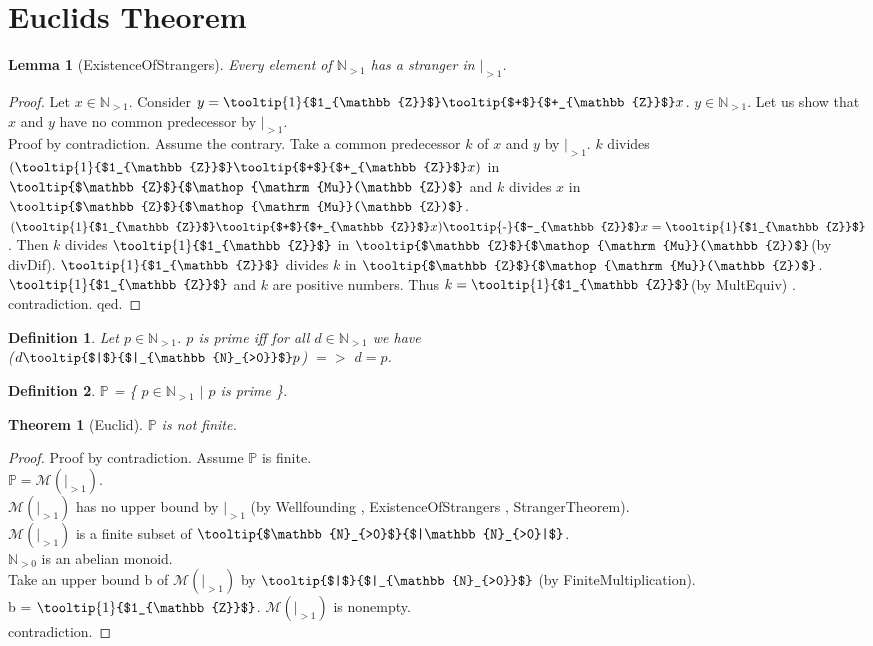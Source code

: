 \documentclass{article}
\DeclareMathOperator{\MuC}{Mu}
\newcommand{\sG}[1]{\mbox{\tooltip{$#1$}{$|#1|$}}}
\newcommand{\pR}[1]{\mbox{\tooltip{$+$}{$+_{#1}$}}}
\newcommand{\Mu}[1]{\mbox{\tooltip{$#1$}{$\MuC(#1)$}}}
\newcommand{\mR}[1]{\mbox{\tooltip{-}{$-_{#1}$}}}
\newcommand{\oR}[1]{\mbox{\tooltip{1}{$1_{#1}$}}}
\newcommand{\oC}[1]{#1}
\newcommand{\Min}[1]{\mathcal{M}(#1)}
\newcommand{\Z}{\mathbb{Z}}
\newcommand{\cP}{\mathbb{P}}
\newcommand{\NPOS}{\mathbb{N}_{>1}}
\newcommand{\NDIV}{\vert_{>1}}
\newcommand{\DIVI}[1]{\mbox{\tooltip{$|$}{$|_{#1}$}}}
\newcommand{\MoPos}{\mathbb{N}_{>0}}
\newtheorem*{definition}{Definition}
\newtheorem{lemma}{Lemma}
\newtheorem*{theorem}{Theorem}
\begin{document}
\section{Euclids Theorem}
\begin{forthel}
	\begin{lemma}[ExistenceOfStrangers]
		Every element of $\NPOS$ has a stranger in $\NDIV$.
	\end{lemma}
	
	\begin{proof}
		Let $x \in \NPOS$. Consider $y = \oR{\Z} \pR{\Z} x$. $y \in \NPOS$. 
		Let us show that $x$ and $y$ have no common predecessor by $\NDIV$. \\
		Proof by contradiction. 
		Assume the contrary.
		Take a common predecessor $k$ of $x$ and $y$ by $\NDIV$.
		$k$ divides $(\oR{\Z} \pR{\Z} x)$ in $\Mu{\Z}$ and $k$ divides $x$ in $\Mu{\Z}$. 
		$(\oR{\Z} \pR{\Z} x) \mR{\Z} x = \oR{\Z}$.
		Then $k$ divides $\oR{\Z}$ in $\Mu{\Z}$(by divDif).
		$\oR{\Z}$ divides $k$ in $\Mu{\Z}$. $\oR{\Z}$ and $k$ are positive numbers.
		Thus $k = \oR{\Z}$(by MultEquiv) . contradiction.
		qed.
	\end{proof}
	
	\begin{definition}
		Let $p \in \NPOS$. $p$ is prime iff for all $d \in \NPOS$ we have \\
		($d \oC{\DIVI{\MoPos}} p$) $=>$ $d = p$. 
	\end{definition}
	\begin{definition}
		$\cP$ = \{ $p \in \NPOS$ $|$ $p$ is prime \}.
	\end{definition}
	\begin{theorem} [Euclid]
		$\cP$ is not finite.
	\end{theorem}
	\begin{proof}
		Proof by contradiction.
		Assume $\cP$ is finite. \\
		$\cP = \Min{\NDIV}$. \\
		$\Min{\NDIV}$ has no upper bound by $\NDIV$ (by Wellfounding , ExistenceOfStrangers , StrangerTheorem). \\
		$\Min{\NDIV}$ is a finite subset of $\sG{\MoPos}$. \\
		$\MoPos$ is an abelian monoid. \\
		Take an upper bound b of $\Min{\NDIV}$ by $\DIVI{\MoPos}$ (by FiniteMultiplication). \\
		b = $\oR{\Z}$. $\Min{\NDIV}$ is nonempty. \\
		contradiction.
	\end{proof}
\end{forthel}
\end{document}
